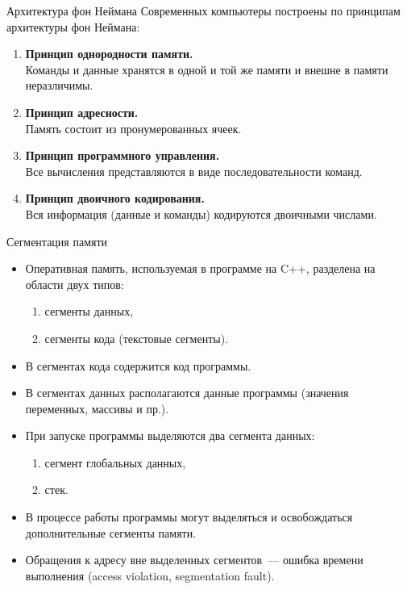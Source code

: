 \documentclass[aspectration=1610,t]{beamer}
\begin{document}
\begin{frame}[fragile]{Архитектура фон Неймана}
Современных компьютеры построены по принципам 
архитектуры фон Неймана:
\begin{enumerate}
    \item {\bf Принцип однородности памяти.}\\
        Команды и данные хранятся в одной и той же памяти и внешне в памяти неразличимы.
    \item {\bf Принцип адресности.}\\
        Память состоит из пронумерованных ячеек.
    \item {\bf Принцип программного управления.}\\
        Все вычисления представляются в виде последовательности команд.
    \item {\bf Принцип двоичного кодирования.}\\
        Вся информация (данные и команды) кодируются двоичными числами.
\end{enumerate}
\end{frame}

\begin{frame}[fragile]{Сегментация памяти}
    \begin{itemize}
        \item Оперативная память, используемая в программе на C++,
            разделена на области двух типов:
            \begin{enumerate}
                \item сегменты данных,
                \item сегменты кода (текстовые сегменты).
            \end{enumerate}

        \item В сегментах кода содержится код программы.

        \item В сегментах данных располагаются данные программы 
            (значения переменных, массивы и пр.).

        \item При запуске программы выделяются два сегмента данных:
            \begin{enumerate}
                \item сегмент глобальных данных,
                \item стек.
            \end{enumerate}

        \item В процессе работы программы могут выделяться и освобождаться
            дополнительные сегменты памяти.

        \item Обращения к адресу вне выделенных сегментов~--- ошибка времени
            выполнения (access violation, segmentation fault).
    \end{itemize}
\end{frame}
\end{document}
